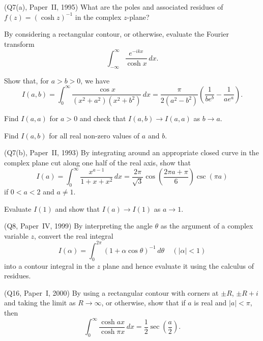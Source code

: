 \begin{question} (Q7(a), Paper~II, 1995)
What are the poles and associated residues of $f(z)=(\cosh z)^{-1}$
in the complex $z$-plane?

By considering a rectangular contour, or otherwise, evaluate
the Fourier transform
\[\int_{-\infty}^{\infty}
\frac{e^{-ikx}}{\cosh x}\,dx.\]
\end{question}
\begin{question} Show that, for $a>b>0$, we have
\[I(a,b)=\int_{0}^{\infty}\frac{\cos x}{(x^{2}+a^{2})(x^{2}+b^{2})}\,dx
=\frac{\pi}{2(a^{2}-b^{2})}\left(\frac{1}{be^{b}}-\frac{1}{ae^{a}}\right).\]

Find $I(a,a)$ for $a>0$ and check that $I(a,b)\rightarrow I(a,a)$
as $b\rightarrow a$.

Find $I(a,b)$ for all real non-zero values of $a$ and $b$.
\end{question}  
\begin{question} (Q7(b), Paper~II, 1993) 
By integrating around an appropriate closed curve in the
complex plane cut along one half of the real axis,
show that
\[I(a)=\int_{0}^{\infty}\frac{x^{a-1}}{1+x+x^{2}}\,dx
=\frac{2\pi}{\sqrt{3}}
\cos\left(\frac{2\pi a+\pi}{6}\right)
\csc(\pi a)\]
if $0<a<2$ and $a\neq 1$.

Evaluate $I(1)$ and show that $I(a)\rightarrow I(1)$ as $a\rightarrow 1$.
\end{question}
\begin{question} (Q8, Paper~IV, 1999) By interpreting
the angle $\theta$ as the argument of a complex variable $z$,
convert the real integral
\[I(\alpha)=\int_{0}^{2\pi}(1+\alpha\cos\theta)^{-1}\,d\theta
\ \ \ \ \ (|\alpha|<1)\]
into a contour integral in the $z$ plane and hence evaluate it
using the calculus of residues.
\end{question} 
\begin{question} (Q16, Paper~I, 2000) By using a rectangular contour
with corners at $\pm R$, $\pm R+i$ and taking the limit 
as $R\rightarrow\infty$, or otherwise, show that if $a$ is
real and $|a|<\pi$, then
\[\int_{0}^{\infty}\frac{\cosh ax}{\cosh \pi x}\,dx
=\frac{1}{2}\sec\left(\frac{a}{2}\right).\]
\end{question}
